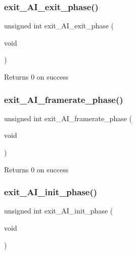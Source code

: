 \subsubsection{\texorpdfstring{exit\+\_\+\+A\+I\+\_\+exit\+\_\+phase()}{exit\_AI\_exit\_phase()}}
{\footnotesize\ttfamily unsigned int exit\+\_\+\+A\+I\+\_\+exit\+\_\+phase (\begin{DoxyParamCaption}\item[{void}]{ }\end{DoxyParamCaption})}

\begin{DoxyReturn}{Returns}
0 on success 
\end{DoxyReturn}
\mbox{\label{group__phase__functions_ga32e701467822bc27478c216b7da06ec8}} 
\subsubsection{\texorpdfstring{exit\+\_\+\+A\+I\+\_\+framerate\+\_\+phase()}{exit\_AI\_framerate\_phase()}}
{\footnotesize\ttfamily unsigned int exit\+\_\+\+A\+I\+\_\+framerate\+\_\+phase (\begin{DoxyParamCaption}\item[{void}]{ }\end{DoxyParamCaption})}

\begin{DoxyReturn}{Returns}
0 on success 
\end{DoxyReturn}
\mbox{\label{group__phase__functions_ga98bab61b394f3485b919280ea9af876f}} 
\subsubsection{\texorpdfstring{exit\+\_\+\+A\+I\+\_\+init\+\_\+phase()}{exit\_AI\_init\_phase()}}
{\footnotesize\ttfamily unsigned int exit\+\_\+\+A\+I\+\_\+init\+\_\+phase (\begin{DoxyParamCaption}\item[{void}]{ }\end{DoxyParamCaption})}

